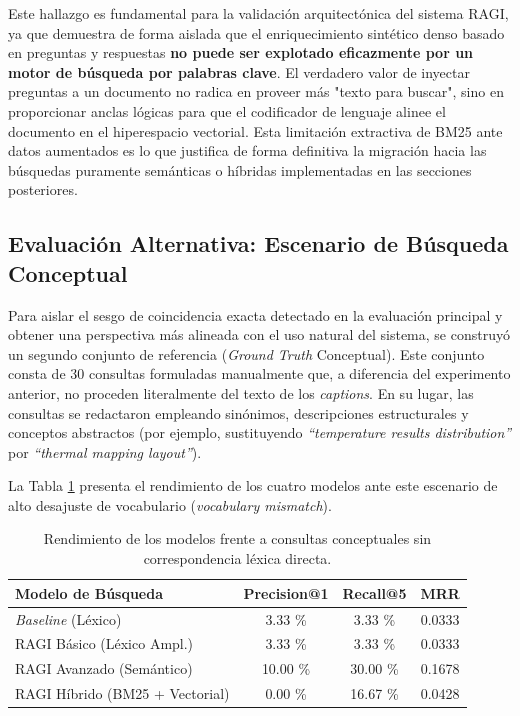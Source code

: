 \documentclass[a4paper]{report}
\renewcommand{\arraystretch}{1.5}
\begin{document}
Este hallazgo es fundamental para la validación arquitectónica del sistema RAGI, ya que demuestra de forma aislada que el enriquecimiento sintético denso basado en preguntas y respuestas \textbf{no puede ser explotado eficazmente por un motor de búsqueda por palabras clave}. El verdadero valor de inyectar preguntas a un documento no radica en proveer más "texto para buscar", sino en proporcionar anclas lógicas para que el codificador de lenguaje alinee el documento en el hiperespacio vectorial. Esta limitación extractiva de BM25 ante datos aumentados es lo que justifica de forma definitiva la migración hacia las búsquedas puramente semánticas o híbridas implementadas en las secciones posteriores.

\subsection{Evaluación Alternativa: Escenario de Búsqueda Conceptual}
\label{sec:resultados_conceptuales}

Para aislar el sesgo de coincidencia exacta detectado en la evaluación principal y obtener una perspectiva más alineada con el uso natural del sistema, se construyó un segundo conjunto de referencia (\textit{Ground Truth} Conceptual). Este conjunto consta de 30 consultas formuladas manualmente que, a diferencia del experimento anterior, no proceden literalmente del texto de los \textit{captions}. En su lugar, las consultas se redactaron empleando sinónimos, descripciones estructurales y conceptos abstractos (por ejemplo, sustituyendo \textit{``temperature results distribution''} por \textit{``thermal mapping layout''}).

La Tabla \ref{tab:resultados_conceptuales} presenta el rendimiento de los cuatro modelos ante este escenario de alto desajuste de vocabulario (\textit{vocabulary mismatch}).

\begin{table}[H]
    \centering
    \renewcommand{\arraystretch}{1.3} 
    \begin{tabular}{|p{4.5cm}|c|c|c|}
        \hline
        \textbf{Modelo de Búsqueda} & \textbf{Precision@1} & \textbf{Recall@5} & \textbf{MRR} \\ 
        \hline
        \textit{Baseline} (Léxico) & 3.33 \% & 3.33 \% & 0.0333 \\ 
        \hline
        RAGI Básico (Léxico Ampl.) & 3.33 \% & 3.33 \% & 0.0333 \\ 
        \hline
        RAGI Avanzado (Semántico) & 10.00 \% & 30.00 \% & 0.1678 \\ 
        \hline
        RAGI Híbrido (BM25 + Vectorial) & 0.00 \% & 16.67 \% & 0.0428 \\ 
        \hline
    \end{tabular}
    \caption{Rendimiento de los modelos frente a consultas conceptuales sin correspondencia léxica directa.}
    \label{tab:resultados_conceptuales}
\end{table}
\end{document}
